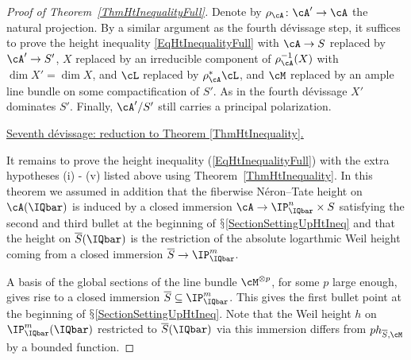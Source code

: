 \begin{proof}[Proof of Theorem~\ref{ThmHtInequalityFull}]
Denote by $\rho_{\cA} \colon \cA' \rightarrow \cA$ the natural
projection. By a similar argument as the fourth d\'{e}vissage step, it
suffices to prove the height inequality \eqref{EqHtInequalityFull} with
$\cA \rightarrow S$ replaced by $\cA' \rightarrow S'$, $X$ replaced by
an irreducible component of $\rho_{\cA}^{-1}(X)$ with $\dim X'=\dim
X$, and $\cL$ replaced by $\rho_{\cA}^*\cL$, and $\cM$ replaced by
an ample line bundle on some compactification of $S'$.
  As in the fourth d\'evissage  $X'$ dominates $S'$. Finally,
  $\cA'/S'$ still carries a principal polarization.


\ul{Seventh d\'{e}vissage: reduction to  Theorem {\ref{ThmHtInequality}}.}

It remains to prove the height inequality (\ref{EqHtInequalityFull})
with the extra hypotheses (i) - (v) listed above using
Theorem~\ref{ThmHtInequality}. In this theorem we assumed in addition that
the
fiberwise  N\'eron--Tate height on $\cA(\IQbar)$
is induced by  a closed immersion $\cA \rightarrow \IP^n_{\IQbar}
\times S$ satisfying the second and third bullet  at the beginning of
$\mathsection$\ref{SectionSettingUpHtIneq} and
that the height on $\overline S(\IQbar)$ is the restriction of the absolute
logarthmic Weil height coming from a closed immersion
$\overline S\rightarrow\IP^m_{\IQbar}$.

A basis of the global sections of the line bundle $\cM^{\otimes p}$,
for some $p$ large enough, gives rise to a closed immersion $\overline S \subseteq
\IP_{\IQbar}^m$. This gives the first bullet point at the beginning of
$\mathsection$\ref{SectionSettingUpHtIneq}. Note that the Weil
height $h$ on $\IP_\IQbar^m(\IQbar)$ restricted to $\overline
S(\IQbar)$ via this immersion differs from
$p h_{\overline S,\cM}$ by a bounded function.


\end{proof}
